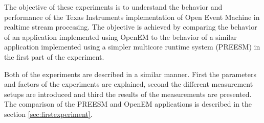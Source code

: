 The objective of these experiments is to understand the behavior and performance of the Texas Instruments implementation of Open Event Machine in realtime stream processing. The objective is achieved by comparing the behavior of an application implemented using OpenEM to the behavior of a similar application implemented using a simpler multicore runtime system (PREESM) in the first part of the experiment. 

Both of the experiments are described in a similar manner. First the parameters and factors of the experiments are explained, second the different measurement setups are introduced and third the results of the measurements are presented.  The comparison of the PREESM and OpenEM applications is described in the section \ref{sec:firstexperiment}.

